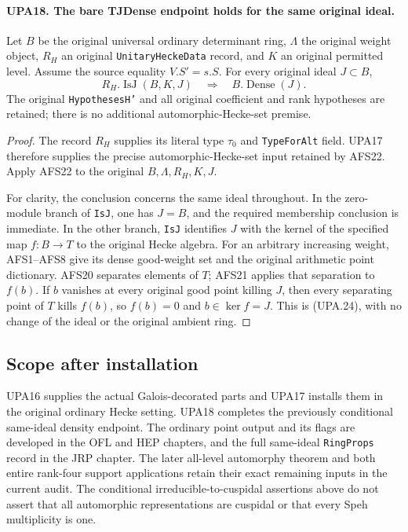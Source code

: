 \paragraph{UPA18. The bare TJDense endpoint holds for the same original ideal.}
\label{claim:UPA18}
Let $B$ be the original universal ordinary determinant
ring, $\Lambda$ the original weight object, $R_H$ an
original \texttt{UnitaryHeckeData} record, and $K$ an
original permitted level.  Assume the source equality
$V.S'=s.S$.  For every original ideal $J\subset B$,
\[
                  R_H.\operatorname{IsJ}(B,K,J)
                         \quad\Longrightarrow\quad
                  B.\operatorname{Dense}(J).
 \tag{UPA.24}
\]
The original \texttt{HypothesesH'} and all original
coefficient and rank hypotheses are retained; there
is no additional automorphic-Hecke-set premise.
\begin{proof}
The record $R_H$ supplies its literal type
$\tau_0$ and \texttt{TypeForAlt} field.  UPA17
therefore supplies the precise automorphic-Hecke-set
input retained by AFS22.  Apply AFS22 to the original
$B,\Lambda,R_H,K,J$.

For clarity, the conclusion concerns the same ideal
throughout.  In the zero-module branch of
\texttt{IsJ}, one has $J=B$, and the required membership
conclusion is immediate.  In the other branch,
\texttt{IsJ} identifies $J$ with the kernel of the
specified map $f:B\to T$ to the original Hecke algebra.
For an arbitrary increasing weight, AFS1--AFS8 give
its dense good-weight set and the original arithmetic
point dictionary.  AFS20 separates elements of $T$;
AFS21 applies that separation to $f(b)$.
If $b$ vanishes at every original good point killing
$J$, then every separating point of $T$ kills $f(b)$,
so $f(b)=0$ and $b\in\ker f=J$.
This is (UPA.24), with no change of the ideal or
the original ambient ring.
\end{proof}

\subsection{Scope after installation}

UPA16 supplies the actual Galois-decorated parts and
UPA17 installs them in the original ordinary Hecke setting.
UPA18 completes the previously conditional same-ideal density
endpoint.  The ordinary point output and its flags are developed
in the OFL and HEP chapters, and the full same-ideal
\texttt{RingProps} record in the JRP chapter.  The later all-level
automorphy theorem and both entire rank-four support applications
retain their exact remaining inputs in the current audit.
The conditional irreducible-to-cuspidal assertions above
do not assert that all automorphic representations are
cuspidal or that every Speh multiplicity is one.
